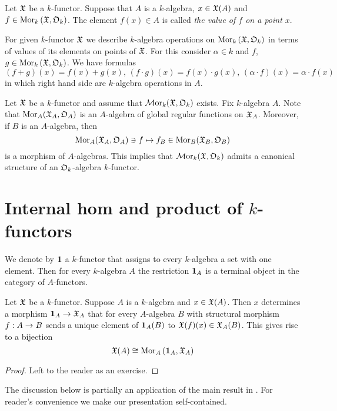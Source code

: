 \begin{definition}
Let ${\mathfrak X}$ be a $k$-functor. Suppose that $A$ is a $k$-algebra, $x\in {\mathfrak X}(A)$ and $f\in \mathrm{Mor}_k\left({\mathfrak X},{\mathfrak O}_k\right)$. The element $f(x) \in A$ is called \textit{the value of $f$ on a point $x$}.
\end{definition}
\noindent
For given $k$-functor ${\mathfrak X}$ we describe $k$-algebra operations on $\mathrm{Mor}_k\left({\mathfrak X},{\mathfrak O}_k\right)$ in terms of values of its elements on points of ${\mathfrak X}$. For this consider $\alpha \in k$ and $f$, $g\in \mathrm{Mor}_k\left({\mathfrak X}, {\mathfrak O}_k\right)$. We have formulas
$$\left(f+g\right)(x) = f(x)+g(x),\,\left(f\cdot g\right)(x) = f(x)\cdot g(x),\,\left(\alpha \cdot f\right)(x) = \alpha \cdot f(x)$$
in which right hand side are $k$-algebra operations in $A$.

\begin{example}\label{example:regular_functions_as_an_algebra_over_structure_algebra}
Let ${\mathfrak X}$ be a $k$-functor and assume that $\mathcal{M}\mathrm{or}_k({\mathfrak X},{\mathfrak O}_k)$ exists. Fix $k$-algebra $A$. Note that $\mathrm{Mor}_A({\mathfrak X}_A,{\mathfrak O}_A)$ is an $A$-algebra of global regular functions on ${\mathfrak X}_A$. Moreover, if $B$ is an $A$-algebra, then
$$\mathrm{Mor}_A({\mathfrak X}_A,{\mathfrak O}_A) \ni f \mapsto f_B\in \mathrm{Mor}_B({\mathfrak X}_B,{\mathfrak O}_B)$$
is a morphism of $A$-algebras. This implies that $\mathcal{M}\mathrm{or}_k({\mathfrak X},{\mathfrak O}_k)$ admits a canonical structure of an ${\mathfrak O}_k$-algebra $k$-functor.
\end{example}

\section{Internal hom and product of $k$-functors}
\noindent
We denote by $\mathbf{1}$ a $k$-functor that assigns to every $k$-algebra a set with one element. Then for every $k$-algebra $A$ the restriction $\mathbf{1}_A$ is a terminal object in the category of $A$-functors.

\begin{fact}\label{fact:points_and_morphisms_from_terminal_k_functor}
Let ${\mathfrak X}$ be a $k$-functor. Suppose $A$ is a $k$-algebra and $x\in {\mathfrak X}(A)$. Then $x$ determines a morphism $\mathbf{1}_{A}\rightarrow {\mathfrak X}_A$ that for every $A$-algebra $B$ with structural morphism $f:A\rightarrow B$ sends a unique element of $\mathbf{1}_{A}(B)$ to ${\mathfrak X}(f)(x)\in {\mathfrak X}_A(B)$. This gives rise to a bijection
$${\mathfrak X}(A)\cong \mathrm{Mor}_{A}\left(\mathbf{1}_{A},{\mathfrak X}_A\right)$$
\end{fact}
\begin{proof}
Left to the reader as an exercise.
\end{proof}
\noindent
The discussion below is partially an application of the main result in {\cite[section 6]{Presheaves}}. For reader's convenience we make our presentation self-contained.

